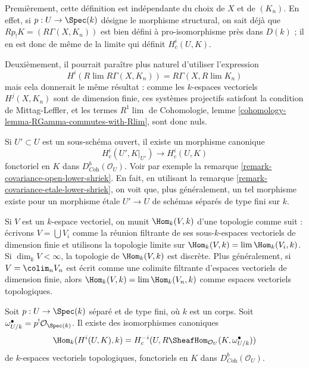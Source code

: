\medskip\noindent
Premièrement, cette définition est indépendante du choix de $X$ et de $(K_n)$. En effet, si $p : U \to \Spec(k)$ désigne le morphisme structural, on sait déjà que $Rp_!K = (R\Gamma(X, K_n))$ est bien défini à pro-isomorphisme près dans $D(k)$ ; il en est donc de même de la limite qui définit $H^i_c(U, K)$.

\medskip\noindent
Deuxièmement, il pourrait paraître plus naturel d'utiliser l'expression
$$
H^i(R\lim R\Gamma(X, K_n)) = R\Gamma(X, R\lim K_n)
$$
mais cela donnerait le même résultat : comme les $k$-espaces vectoriels $H^j(X, K_n)$ sont de dimension finie, ces systèmes projectifs satisfont la condition de Mittag-Leffler, et les termes $R^1\lim$ de Cohomologie, lemme \ref{cohomology-lemma-RGamma-commutes-with-Rlim}, sont donc nuls.

\medskip\noindent
Si $U' \subset U$ est un sous-schéma ouvert, il existe un morphisme canonique
$$
H^i_c(U', K|_{U'}) \longrightarrow H^i_c(U, K)
$$
fonctoriel en $K$ dans $D^b_{\textit{Coh}}(\mathcal{O}_U)$. Voir par exemple la remarque \ref{remark-covariance-open-lower-shriek}. En fait, en utilisant la remarque \ref{remark-covariance-etale-lower-shriek}, on voit que, plus généralement, un tel morphisme existe pour un morphisme \'etale $U' \to U$ de schémas séparés de type fini sur $k$.

\medskip\noindent
Si $V$ est un $k$-espace vectoriel, on munit $\Hom_k(V, k)$ d'une topologie comme suit : écrivons $V = \bigcup V_i$ comme la réunion filtrante de ses sous-$k$-espaces vectoriels de dimension finie et utilisons la topologie limite sur $\Hom_k(V, k) = \lim \Hom_k(V_i, k)$. Si $\dim_k V < \infty$, la topologie de $\Hom_k(V, k)$ est discrète. Plus généralement, si $V = \colim_n V_n$ est écrit comme une colimite filtrante d'espaces vectoriels de dimension finie, alors $\Hom_k(V, k) = \lim \Hom_k(V_n, k)$ comme espaces vectoriels topologiques.

\begin{lemma}
\label{lemma-duality-compact-support}
Soit $p : U \to \Spec(k)$ séparé et de type fini, où $k$ est un corps. Soit $\omega_{U/k}^\bullet = p^!\mathcal{O}_{\Spec(k)}$. Il existe des isomorphismes canoniques
$$
\Hom_k(H^i(U, K), k) =
H^{-i}_c(U, R\SheafHom_{\mathcal{O}_U}(K, \omega_{U/k}^\bullet))
$$
de $k$-espaces vectoriels topologiques, fonctoriels en $K$ dans $D^b_{\textit{Coh}}(\mathcal{O}_U)$.
\end{lemma}

